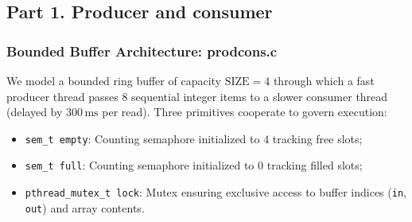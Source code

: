 \documentclass{labreport}
\begin{document}
\subsection{Part 1. Producer and consumer}

\subsubsection{Bounded Buffer Architecture: prodcons.c}
We model a bounded ring buffer of capacity $\text{SIZE} = 4$ through which a fast producer thread passes $8$ sequential integer items to a slower consumer thread (delayed by $300\,\text{ms}$ per read). Three primitives cooperate to govern execution:
\begin{itemize}[noitemsep]
    \item \texttt{sem\_t empty}: Counting semaphore initialized to $4$ tracking free slots;
    \item \texttt{sem\_t full}: Counting semaphore initialized to $0$ tracking filled slots;
    \item \texttt{pthread\_mutex\_t lock}: Mutex ensuring exclusive access to buffer indices (\texttt{in}, \texttt{out}) and array contents.
\end{itemize}
\end{document}

